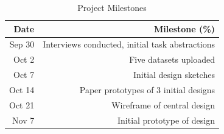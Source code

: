 \begin{table}[h]
 \caption{Project Milestones}\vspace{1ex} %
 \label{tab:milestones}
 \scriptsize
 \centering %
   \begin{tabular}{r|r}
     Date & Milestone (\%)\\
   \hline
     Sep 30 & Interviews conducted, initial task abstractions\\
     Oct  2 & Five datasets uploaded \\
     Oct  7 & Initial design sketches\\
     Oct 14 & Paper prototypes of 3 initial designs\\
     Oct 21 & Wireframe of central design \\
     Nov 7 & Initial prototype of design 
   \end{tabular}
\end{table}

